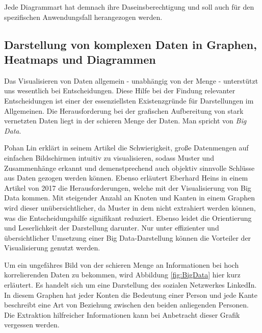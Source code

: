 Jede Diagrammart hat demnach ihre Daseinsberechtigung und soll auch für den spezifischen Anwendungsfall herangezogen werden. \cite{marktler2020diagrammtypen}

\subsection{Darstellung von komplexen Daten in Graphen, Heatmaps und Diagrammen}

Das Visualisieren von Daten allgemein - unabhängig von der Menge - unterstützt uns wesentlich bei Entscheidungen. Diese Hilfe bei der Findung relevanter Entscheidungen ist einer der essenziellsten Existenzgründe für Darstellungen im Allgemeinen. Die Herausforderung bei der grafischen Aufbereitung von stark vernetzten Daten liegt in der schieren Menge der Daten. Man spricht von \emph{Big Data}. \cite{2020simplevis,lin2023guide}

Pohan Lin erklärt in seinem Artikel die Schwierigkeit, große Datenmengen auf einfachen Bildschirmen intuitiv zu visualisieren, sodass Muster und Zusammenhänge erkannt und demenstprechend auch objektiv sinnvolle Schlüsse aus Daten gezogen werden können. Ebenso erläutert Eberhard Heins in einem Artikel von 2017 die Herausforderungen, welche mit der Visualisierung von Big Data kommen. Mit steigender Anzahl an Knoten und Kanten in einem Graphen wird dieser unübersichtlicher, da Muster in dem  nicht extrahiert werden können, was die Entscheidungshilfe signifikant reduziert. Ebenso leidet die Orientierung und Leserlichkeit der Darstellung darunter. Nur unter effizienter und übersichtlicher Umsetzung einer Big Data-Darstellung können die Vorteiler der Visualisierung genutzt werden. \cite{lin2023guide,heins2017herausforderungen}

Um ein ungefähres Bild von der schieren Menge an Informationen bei hoch korrelierenden Daten zu bekommen, wird Abbildung \ref{fig:BigData} hier kurz erläutert. Es handelt sich um eine Darstellung des sozialen Netzwerkes LinkedIn. In diesem Graphen hat jeder Konten die Bedeutung einer Person und jede Kante beschreibt eine Art von Beziehung zwischen den beiden anliegenden Personen. Die Extraktion hilfreicher Informationen kann bei Anbetracht dieser Grafik vergessen werden.

